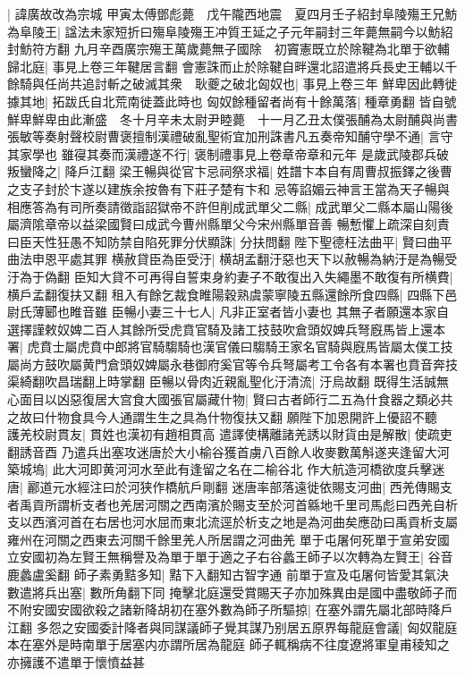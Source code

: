 |{
	諱廣故改為宗城}
甲寅太傅鄧彪薨　戊午隴西地震　夏四月壬子紹封阜陵殤王兄魴為阜陵王|{
	諡法未家短折曰殤阜陵殤王冲質王延之子元年嗣封三年薨無嗣今以魴紹封魴符方翻}
九月辛酉廣宗殤王萬歲薨無子國除　初竇憲既立於除鞬為北單于欲輔歸北庭|{
	事見上卷三年鞬居言翻}
會憲誅而止於除鞬自畔還北詔遣將兵長史王輔以千餘騎與任尚共追討斬之破滅其衆　耿夔之破北匈奴也|{
	事見上卷三年}
鮮卑因此轉徙據其地|{
	拓跋氏自北荒南徙蓋此時也}
匈奴餘種留者尚有十餘萬落|{
	種章勇翻}
皆自號鮮卑鮮卑由此漸盛　冬十月辛未太尉尹睦薨　十一月乙丑太僕張酺為太尉酺與尚書張敏等奏射聲校尉曹褒擅制漢禮破亂聖術宜加刑誅書凡五奏帝知酺守學不通|{
	言守其家學也}
雖寑其奏而漢禮遂不行|{
	褒制禮事見上卷章帝章和元年}
是歲武陵郡兵破叛蠻降之|{
	降戶江翻}
梁王暢與從官卞忌祠祭求福|{
	姓譜卞本自有周曹叔振鐸之後曹之支子封於卞遂以建族余按魯有下莊子楚有卞和}
忌等諂媚云神言王當為天子暢與相應答為有司所奏請徵詣詔獄帝不許但削成武單父二縣|{
	成武單父二縣本屬山陽後屬濟隂章帝以益梁國賢曰成武今曹州縣單父今宋州縣單音善}
暢慙懼上疏深自刻責曰臣天性狂愚不知防禁自陷死罪分伏顯誅|{
	分扶問翻}
陛下聖德枉法曲平|{
	賢曰曲平曲法申恩平處其罪}
横赦貸臣為臣受汙|{
	横胡孟翻汙惡也天下以赦暢為納汙是為暢受汙為于偽翻}
臣知大貸不可再得自誓束身約妻子不敢復出入失繩墨不敢復有所横費|{
	横戶孟翻復扶又翻}
租入有餘乞裁食睢陽穀熟虞蒙寧陵五縣還餘所食四縣|{
	四縣下邑尉氏薄郾也睢音雖}
臣暢小妻三十七人|{
	凡非正室者皆小妻也}
其無子者願還本家自選擇謹敕奴婢二百人其餘所受虎賁官騎及諸工技鼓吹倉頭奴婢兵弩廐馬皆上還本署|{
	虎賁士屬虎賁中郎將官騎騶騎也漢官儀曰騶騎王家名官騎與廐馬皆屬太僕工技屬尚方鼓吹屬黄門倉頭奴婢屬永巷御府奚官等令兵弩屬考工令各有本署也賁音奔技渠綺翻吹昌瑞翻上時掌翻}
臣暢以骨肉近親亂聖化汙清流|{
	汙烏故翻}
既得生活誠無心面目以凶惡復居大宫食大國張官屬藏什物|{
	賢曰古者師行二五為什食器之類必共之故曰什物食具今人通謂生生之具為什物復扶又翻}
願陛下加恩開許上優詔不聽　護羌校尉貫友|{
	貫姓也漢初有趙相貫高}
遣譯使構離諸羌誘以財貨由是解散|{
	使疏吏翻誘音酉}
乃遣兵出塞攻迷唐於大小榆谷獲首虜八百餘人收麥數萬斛遂夹逢留大河築城塢|{
	此大河即黄河河水至此有逢留之名在二榆谷北}
作大航造河橋欲度兵擊迷唐|{
	酈道元水經注曰於河狭作橋航戶剛翻}
迷唐率部落遠徙依賜支河曲|{
	西羌傳賜支者禹貢所謂析支者也羌居河關之西南濱於賜支至於河首緜地千里司馬彪曰西羌自析支以西濱河首在右居也河水屈而東北流逕於析支之地是為河曲矣應劭曰禹貢析支屬雍州在河關之西東去河關千餘里羌人所居謂之河曲羌}
單于屯屠何死單于宣弟安國立安國初為左賢王無稱譽及為單于單于適之子右谷蠡王師子以次轉為左賢王|{
	谷音鹿蠡盧奚翻}
師子素勇黠多知|{
	黠下入翻知古智字通}
前單于宣及屯屠何皆愛其氣決數遣將兵出塞|{
	數所角翻下同}
掩擊北庭還受賞賜天子亦加殊異由是國中盡敬師子而不附安國安國欲殺之諸新降胡初在塞外數為師子所驅掠|{
	在塞外謂先屬北部時降戶江翻}
多怨之安國委計降者與同謀議師子覺其謀乃别居五原界每龍庭會議|{
	匈奴龍庭本在塞外是時南單于居塞内亦謂所居為龍庭}
師子輒稱病不往度遼將軍皇甫稜知之亦擁護不遣單于懷憤益甚

